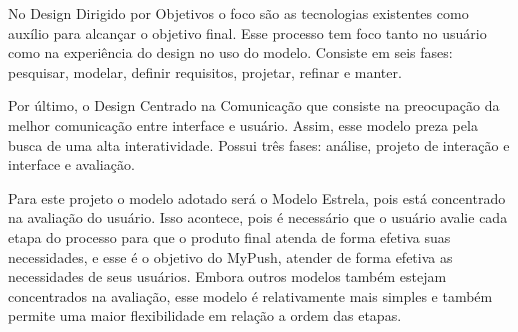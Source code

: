 No Design Dirigido por Objetivos o foco são as tecnologias existentes como auxílio para alcançar o objetivo final. Esse processo tem foco tanto no usuário como na
experiência do design no uso do modelo. Consiste em seis fases: pesquisar, modelar, definir requisitos, projetar, refinar e manter. \cite{BARBOSA}

Por último, o Design Centrado na Comunicação que consiste na preocupação da melhor comunicação entre interface e usuário. Assim, esse modelo preza pela busca de uma
alta interatividade. Possui três fases: análise, projeto de interação e interface e avaliação. \cite{BARBOSA}

Para este projeto o modelo adotado será o Modelo Estrela, pois está concentrado na avaliação do usuário. Isso acontece, pois é necessário que o usuário avalie cada 
etapa do processo para que o produto final atenda de forma efetiva suas necessidades, e esse é o objetivo do MyPush, atender de forma efetiva as necessidades de seus
usuários. Embora outros modelos também estejam concentrados na avaliação, esse modelo é relativamente mais simples e também permite uma maior flexibilidade em relação a
ordem das etapas. 